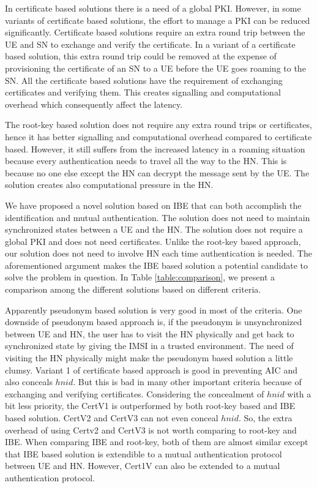 \documentclass{river-journal}
\begin{document}
In certificate based solutions there is a need of a global PKI. However, in some variants of certificate based solutions, the effort to manage a PKI can be reduced significantly. Certificate based solutions require an extra round trip between the UE and SN to exchange and verify the certificate. In a variant of a certificate based solution, this extra round trip could be removed at the expense of provisioning the certificate of an SN to a UE before the UE goes roaming to the SN. All the certificate based solutions have the requirement of exchanging certificates and verifying them. This creates signalling and computational overhead which consequently affect the latency. 

The root-key based solution does not require any extra round trips or certificates, hence it has better signalling and computational overhead compared to certificate based. However, it still suffers from the increased latency in a roaming situation because every authentication needs to travel all the way to the HN. This is because no one else except the HN can decrypt the message sent by the UE. The solution creates also computational pressure in the HN. 

We have proposed a novel solution based on IBE that can both accomplish the identification and mutual authentication. The solution does not need to maintain synchronized states between a UE and the HN. The solution does not require a global PKI and does not need certificates. Unlike the root-key based approach, our solution does not need to involve HN each time authentication is needed. The aforementioned argument makes the IBE based solution a potential candidate to solve the problem in question. In Table \ref{table:comparison}, we present a comparison among the different solutions based on different criteria.

Apparently pseudonym based solution is very good in most of the criteria. One downside of pseudonym based approach is, if the pseudonym is unsynchronized between UE and HN, the user has to visit the HN physically and get back to synchronized state by giving the IMSI in a trusted environment. The need of visiting the HN physically might make the pseudonym based solution a little clumsy. Variant 1 of certificate based approach is good in preventing AIC and also conceals $hnid$. But this is bad in many other important criteria because of exchanging and verifying certificates. Considering the concealment of $hnid$ with a bit less priority, the CertV1 is outperformed by both root-key based and IBE based solution. CertV2 and CertV3 can not even conceal $hnid$. So, the extra overhead of using Certv2 and CertV3 is not worth comparing to root-key and IBE. When comparing IBE and root-key, both of them are almost similar except that IBE based solution is extendible to a mutual authentication protocol between UE and HN. However, Cert1V can also be extended to a mutual authentication protocol. 
\end{document}
